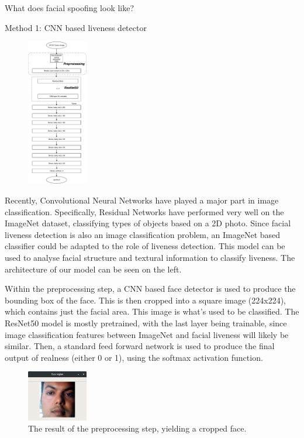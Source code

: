\documentclass[final]{beamer}
\begin{document}
\begin{frame}{}
\begin{columns}[t]
\begin{column}{.48\linewidth}
\begin{block}{What does facial spoofing look like?}
        \end{block}
        \begin{block}{Method 1: CNN based liveness detector}
          \begin{figure}
            \includegraphics[width=100px]{2DCNNArchitecture.pdf}
          \end{figure}
          Recently, Convolutional Neural Networks have played a major part in image classification. Specifically,
          Residual Networks have performed very well on the ImageNet dataset, classifying types of objects based on a
          2D photo. Since facial liveness detection is also an image classification problem, an ImageNet based classifier could
          be adapted to the role of liveness detection. This model can be used to analyse facial structure and textural information
          to classify liveness. The architecture of our model can be seen on the left.

          Within the preprocessing step, a CNN based face detector is used to produce the bounding box of the face. This is then cropped
          into a square image (224x224), which contains just the facial area. This image is what's used to be classified. The ResNet50 model
          is mostly pretrained, with the last layer being trainable, since image classification features between ImageNet and facial liveness will
          likely be similar. Then, a standard feed forward network is used to produce the final output of realness (either 0 or 1), using the softmax
          activation function. 

          \begin{figure}
            \centering
            \includegraphics[width=100px]{FaceExtraction.png}
            \caption{The result of the preprocessing step, yielding a cropped face.}
          \end{figure}


\end{block}
\end{column}
\end{columns}
\end{frame}
\end{document}
